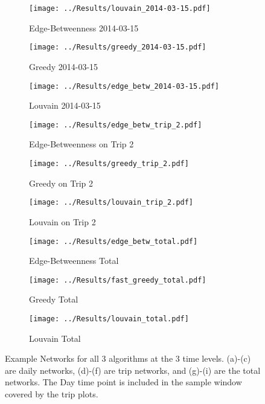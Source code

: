 \documentclass[11pt]{article}
\begin{document}
\begin{figure}[H]
\begin{subfigure}{0.32\textwidth}
\texttt{[image: ../Results/louvain\_2014-03-15.pdf]} 
\caption{Edge-Betweenness 2014-03-15}
\label{fig:subim1}
\end{subfigure}
\begin{subfigure}{0.32\textwidth}
\texttt{[image: ../Results/greedy\_2014-03-15.pdf]}
\caption{Greedy 2014-03-15}
\label{fig:subim2}
\end{subfigure}
\begin{subfigure}{0.32\textwidth}
\texttt{[image: ../Results/edge\_betw\_2014-03-15.pdf]}
\caption{Louvain 2014-03-15}
\label{fig:subim3}
\end{subfigure}
 \begin{subfigure}{0.32\textwidth}
\texttt{[image: ../Results/edge\_betw\_trip\_2.pdf]} 
\caption{Edge-Betweenness on Trip 2}
\label{fig:subim4}
\end{subfigure}
\begin{subfigure}{0.32\textwidth}
\texttt{[image: ../Results/greedy\_trip\_2.pdf]}
\caption{Greedy on Trip 2}
\label{fig:subim5}
\end{subfigure}
\begin{subfigure}{0.32\textwidth}
\texttt{[image: ../Results/louvain\_trip\_2.pdf]}
\caption{Louvain on Trip 2}
\label{fig:subim6}
\end{subfigure}
\label{fig:image7}
\begin{subfigure}{0.32\textwidth}
\texttt{[image: ../Results/edge\_betw\_total.pdf]} 
\caption{Edge-Betweenness Total}
\label{fig:subim8}
\end{subfigure}
\begin{subfigure}{0.32\textwidth}
\texttt{[image: ../Results/fast\_greedy\_total.pdf]}
\caption{Greedy Total}
\label{fig:subim9}
\end{subfigure}
\begin{subfigure}{0.32\textwidth}
\texttt{[image: ../Results/louvain\_total.pdf]}
\caption{Louvain Total}
\label{fig:subim10}
\end{subfigure}
\caption{Example Networks for all 3 algorithms at the 3 time levels.  (a)-(c) are daily networks, (d)-(f) are trip networks, and (g)-(i) are the total networks.  The Day time point is included in the sample window covered by the trip plots.}
\end{figure}
\end{document}
